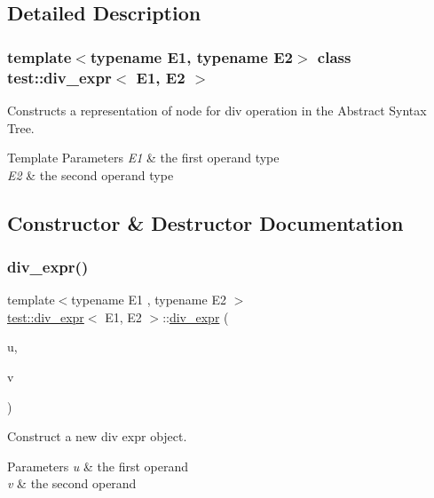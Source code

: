 \subsection{Detailed Description}
\subsubsection*{template$<$typename E1, typename E2$>$\newline
class test\+::div\+\_\+expr$<$ E1, E2 $>$}

Constructs a representation of node for div operation in the Abstract Syntax Tree. 


\begin{DoxyTemplParams}{Template Parameters}
{\em E1} & the first operand type \\
\hline
{\em E2} & the second operand type \\
\hline
\end{DoxyTemplParams}


\subsection{Constructor \& Destructor Documentation}
\mbox{\label{classtest_1_1div__expr_a957776b1695f22338e6e425957e55f0c}} 
\subsubsection{\texorpdfstring{div\_expr()}{div\_expr()}}
{\footnotesize\ttfamily template$<$typename E1 , typename E2 $>$ \\
\mbox{\hyperlink{classtest_1_1div__expr}{test\+::div\+\_\+expr}}$<$ E1, E2 $>$\+::\mbox{\hyperlink{classtest_1_1div__expr}{div\+\_\+expr}} (\begin{DoxyParamCaption}\item[{E1 const \&}]{u,  }\item[{E2 const \&}]{v }\end{DoxyParamCaption})\hspace{0.3cm}{\ttfamily [inline]}}



Construct a new div expr object. 


\begin{DoxyParams}{Parameters}
{\em u} & the first operand \\
\hline
{\em v} & the second operand \\
\hline
\end{DoxyParams}



